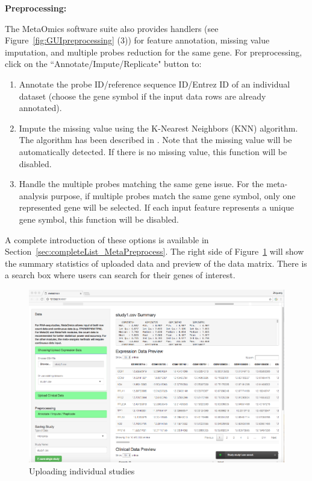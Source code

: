 \begin{steps}
\item \textbf{Preprocessing:}

The MetaOmics software suite also provides handlers (see Figure~\ref{fig:GUIpreprocessing} {\color{red} (3)}) for feature annotation, 
missing value imputation, and multiple probes reduction for the same gene.
For preprocessing, 
click on the ``Annotate/Impute/Replicate" button to:
\begin{enumerate}
\item Annotate the probe ID/reference sequence ID/Entrez ID of an individual dataset (choose the gene symbol if the input data rows are already annotated).
\item Impute the missing value using the K-Nearest Neighbors (KNN) algorithm.
The algorithm has been described in \cite{troyanskaya2001missing}.
Note that the missing value will be automatically detected. 
If there is no missing value, this function will be disabled.

\item Handle the multiple probes matching the same gene issue.
For the meta-analysis purpose, 
if multiple probes match  the same gene symbol, only one represented gene will be selected.
If each input feature represents a unique gene symbol, this function will be disabled.

\end{enumerate}

A complete introduction of these options is available in Section~\ref{sec:completeList_MetaPreprocess}.
The right side of Figure~\ref{fig:GUIpreview} will show the summary statistics of uploaded data and preview of the data matrix.
There is a search box where users can search for their genes of interest.

\begin{figure}[H]
\begin{center}
\includegraphics[scale=0.35]{./figure/preprocessing/GUIpreview}
\caption{Uploading individual studies}
\label{fig:GUIpreview}
\end{center}
\end{figure}


\end{steps}
